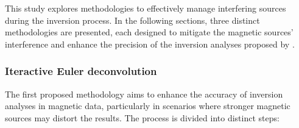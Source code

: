 This study explores methodologies to effectively manage interfering sources during the inversion process. In the following sections, three distinct methodologies are presented, each designed to mitigate the magnetic sources' interference and enhance the precision of the inversion analyses proposed by \citet{Souza-Junior2023b}.





    
    



\subsubsection{Iteractive Euler deconvolution}

The first proposed methodology aims to enhance the accuracy of inversion analyses in magnetic data, particularly in scenarios where stronger magnetic sources may distort the results. The process is divided into distinct steps:

